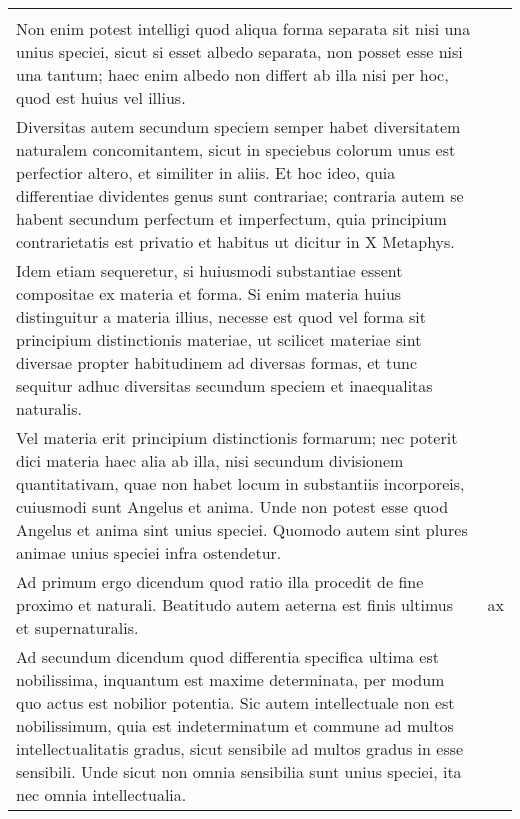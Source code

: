 \documentclass[10pt]{jsarticle} %
\begin{document}
\begin{longtable}{p{21em}p{21em}}
&

\\


Non enim potest intelligi
 quod aliqua forma separata sit nisi una unius speciei, sicut si esset
 albedo separata, non posset esse nisi una tantum; haec enim albedo
 non differt ab illa nisi per hoc, quod est huius vel
 illius. 


&

\\

Diversitas autem secundum speciem semper habet diversitatem
 naturalem concomitantem, sicut in speciebus colorum unus est
 perfectior altero, et similiter in aliis. Et hoc ideo, quia
 differentiae dividentes genus sunt contrariae; contraria autem se
 habent secundum perfectum et imperfectum, quia principium
 contrarietatis est privatio et habitus ut dicitur in X Metaphys. 


&

\\


Idem etiam sequeretur, si huiusmodi substantiae essent compositae ex
 materia et forma. Si enim materia huius distinguitur a materia
 illius, necesse est quod vel forma sit principium distinctionis
 materiae, ut scilicet materiae sint diversae propter habitudinem ad
 diversas formas, et tunc sequitur adhuc diversitas secundum speciem
 et inaequalitas naturalis. 


&

\\


Vel materia erit principium distinctionis
 formarum; nec poterit dici materia haec alia ab illa, nisi secundum
 divisionem quantitativam, quae non habet locum in substantiis
 incorporeis, cuiusmodi sunt Angelus et anima. Unde non potest esse
 quod Angelus et anima sint unius speciei. Quomodo autem sint plures
 animae unius speciei infra ostendetur.


&

\\




Ad primum ergo dicendum quod ratio illa procedit de fine proximo et
 naturali. Beatitudo autem aeterna est finis ultimus et
 supernaturalis.

&

ax\\




Ad secundum dicendum quod differentia specifica ultima est
 nobilissima, inquantum est maxime determinata, per modum quo actus
 est nobilior potentia. Sic autem intellectuale non est nobilissimum,
 quia est indeterminatum et commune ad multos intellectualitatis
 gradus, sicut sensibile ad multos gradus in esse sensibili. Unde
 sicut non omnia sensibilia sunt unius speciei, ita nec omnia
 intellectualia.


\end{longtable}
\end{document}
